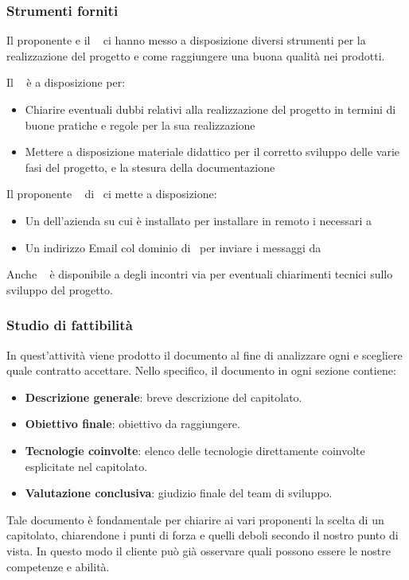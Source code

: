         \subsubsection{Strumenti forniti}
        Il proponente e il \TV~ ci hanno messo a disposizione diversi strumenti per la realizzazione del progetto e come raggiungere una buona qualità nei prodotti. \par
        Il \TV~ è a disposizione per:
        \begin{itemize}
            \item Chiarire eventuali dubbi relativi alla realizzazione del progetto in termini di buone pratiche e regole per la sua realizzazione
            \item Mettere a disposizione materiale didattico per il corretto sviluppo delle varie fasi del progetto, e la stesura della documentazione
        \end{itemize}
        Il proponente \DZ~ di \II\ ci mette a disposizione:
        \begin{itemize}
            \item Un  dell'azienda su cui è installato  per installare in remoto i  necessari a \progetto
            \item Un indirizzo Email col dominio di \II~per inviare i messaggi da \progetto
        \end{itemize}
        Anche \DZ~ è disponibile a degli incontri via  per eventuali chiarimenti tecnici sullo sviluppo del progetto.

        \subsubsection{Studio di fattibilità}\label{PP:Fornitura:SdF}
        In quest'attività viene prodotto il documento \Doc{\SdFv} al fine di analizzare ogni  e scegliere quale contratto accettare.
        Nello specifico, il documento in ogni sezione contiene:
        	\begin{itemize}
        		\item \textbf{Descrizione generale}: breve descrizione del capitolato.
        		\item \textbf{Obiettivo finale}: obiettivo da raggiungere.
        		\item \textbf{Tecnologie coinvolte}: elenco delle tecnologie direttamente coinvolte esplicitate nel capitolato.
        		\item \textbf{Valutazione conclusiva}: giudizio finale del team di sviluppo.
        	\end{itemize}
        Tale documento è fondamentale per chiarire ai vari proponenti la scelta di un capitolato, chiarendone i punti di forza e quelli deboli secondo il nostro punto di vista. In questo modo il cliente può già osservare quali possono essere le nostre competenze e abilità.
        
